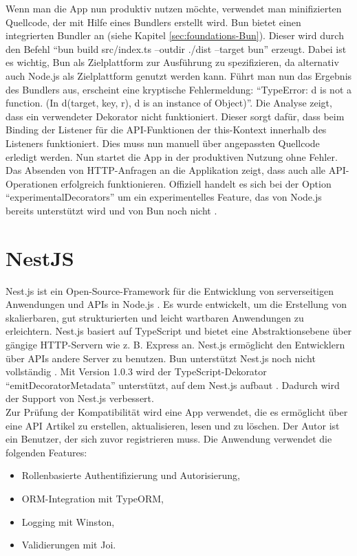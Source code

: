 {\noindent
Wenn man die App nun produktiv nutzen möchte, verwendet man minifizierten Quellcode, der mit Hilfe eines Bundlers erstellt wird. Bun bietet einen integrierten Bundler an (siehe Kapitel \ref{sec:foundations-Bun}). Dieser wird durch den Befehl ``bun build src/index.ts --outdir ./dist --target bun'' erzeugt. Dabei ist es wichtig, Bun als Zielplattform zur Ausführung zu spezifizieren, da alternativ auch Node.js als Zielplattform genutzt werden kann. Führt man nun das Ergebnis des Bundlers aus, erscheint eine kryptische Fehlermeldung: ``TypeError: d is not a function. (In d(target, key, r), d is an instance of Object)''. Die Analyse zeigt, dass ein verwendeter Dekorator nicht funktioniert. Dieser sorgt dafür, dass beim Binding der Listener für die API-Funktionen  der this-Kontext innerhalb des Listeners funktioniert. Dies muss nun manuell über angepassten Quellcode erledigt werden. Nun startet die App in der produktiven Nutzung ohne Fehler. Das Absenden von HTTP-Anfragen an die Applikation zeigt, dass auch alle API-Operationen erfolgreich funktionieren. Offiziell handelt es sich bei der Option ``experimentalDecorators'' um ein experimentelles Feature, das von Node.js bereits unterstützt wird und von Bun noch nicht \cite{Microsoft.2023}.

\section{NestJS} \label{sec:compabitility-nestjs}
Nest.js ist ein Open-Source-Framework für die Entwicklung von serverseitigen Anwendungen und APIs in Node.js \cite{Mysliwiec.2023}. Es wurde entwickelt, um die Erstellung von skalierbaren, gut strukturierten und leicht wartbaren Anwendungen zu erleichtern. Nest.js basiert auf TypeScript und bietet eine Abstraktionsebene über gängige HTTP-Servern wie z. B. Express an. Nest.js ermöglicht den Entwicklern über APIs andere Server zu benutzen. Bun unterstützt Nest.js noch nicht vollständig \cite{Sumner.2022}. Mit Version 1.0.3 wird der TypeScript-Dekorator ``emitDecoratorMetadata'' unterstützt, auf dem Nest.js aufbaut \cite{McDonnel.2023}. Dadurch wird der Support von Nest.js verbessert.\\

\noindent
Zur Prüfung der Kompatibilität wird eine App verwendet, die es ermöglicht über eine API Artikel zu erstellen, aktualisieren, lesen und zu löschen. Der Autor ist ein Benutzer, der sich zuvor registrieren muss. Die Anwendung verwendet die folgenden Features:

\begin{itemize}
	\item Rollenbasierte Authentifizierung und Autorisierung,
	\item ORM-Integration mit TypeORM,
	\item Logging mit Winston,
	\item Validierungen mit Joi.
\end{itemize}

}
